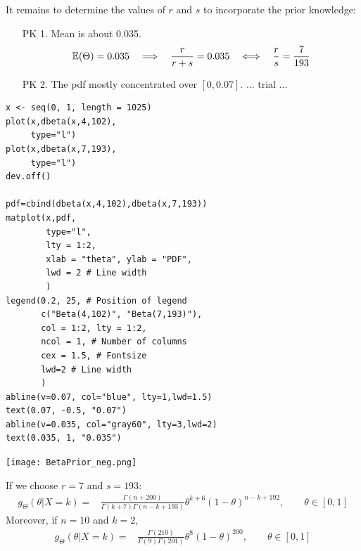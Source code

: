 \begin{frame}

It remains to determine the values of $r$ and $s$ to incorporate the prior knowledge: \\[1em]
\begin{enumerate}
 \item[PK 1.] Mean is about 0.035.
 \[
\mathbb{E}(\Theta) = 0.035 \quad\Longrightarrow\quad \frac{r}{r+s} = 0.035 \quad \Longleftrightarrow \quad \frac{r} {s}= \frac{7}{193}
\]
\vfill
\item[PK 2.] The pdf mostly concentrated over $[0,0.07]$. ... trial ...
\end{enumerate}
\end{frame}
\begin{frame}[fragile]

\begin{minipage}{0.45\textwidth}
  \begin{lstlisting}
x <- seq(0, 1, length = 1025)
plot(x,dbeta(x,4,102),
     type="l")
plot(x,dbeta(x,7,193),
     type="l")
dev.off()

pdf=cbind(dbeta(x,4,102),dbeta(x,7,193))
matplot(x,pdf,
        type="l",
        lty = 1:2,
        xlab = "theta", ylab = "PDF",
        lwd = 2 # Line width
        )
legend(0.2, 25, # Position of legend
       c("Beta(4,102)", "Beta(7,193)"),
       col = 1:2, lty = 1:2,
       ncol = 1, # Number of columns
       cex = 1.5, # Fontsize
       lwd=2 # Line width
       )
abline(v=0.07, col="blue", lty=1,lwd=1.5)
text(0.07, -0.5, "0.07")
abline(v=0.035, col="gray60", lty=3,lwd=2)
text(0.035, 1, "0.035")
\end{lstlisting}
\end{minipage}
\begin{minipage}{0.5\textwidth}
  \texttt{[image: BetaPrior\_neg.png]}
\end{minipage}
\end{frame}
\begin{frame}
If we choose $r=7$ and $s=193$:
 \begin{align*}
  g_\Theta(\theta|X=k) = & \frac{\Gamma(n+200)}{\Gamma(k+7)\Gamma(n-k+193)} \theta^{k+6} (1-\theta)^{n-k+192}, \qquad \theta\in[0,1]
 \end{align*}
 \vfill
 Moreover, if $n=10$ and $k=2$,
  \begin{align*}
  g_\Theta(\theta|X=k) = & \frac{\Gamma(210)}{\Gamma(9)\Gamma(201)} \theta^{8} (1-\theta)^{200}, \qquad \theta\in[0,1]
 \end{align*}
\end{frame}
